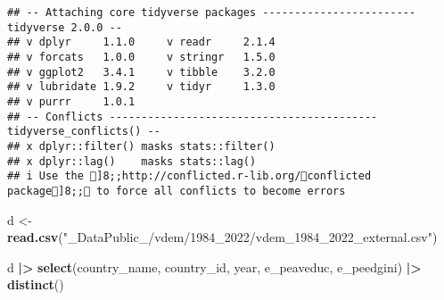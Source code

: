 \documentclass[
]{article}
\newenvironment{Shaded}{\begin{snugshade}}{\end{snugshade}}
\newcommand{\FunctionTok}[1]{\textcolor[rgb]{0.13,0.29,0.53}{\textbf{#1}}}
\newcommand{\NormalTok}[1]{#1}
\newcommand{\OtherTok}[1]{\textcolor[rgb]{0.56,0.35,0.01}{#1}}
\newcommand{\SpecialCharTok}[1]{\textcolor[rgb]{0.81,0.36,0.00}{\textbf{#1}}}
\newcommand{\StringTok}[1]{\textcolor[rgb]{0.31,0.60,0.02}{#1}}
\begin{document}
\begin{verbatim}
## -- Attaching core tidyverse packages ------------------------ tidyverse 2.0.0 --
## v dplyr     1.1.0     v readr     2.1.4
## v forcats   1.0.0     v stringr   1.5.0
## v ggplot2   3.4.1     v tibble    3.2.0
## v lubridate 1.9.2     v tidyr     1.3.0
## v purrr     1.0.1     
## -- Conflicts ------------------------------------------ tidyverse_conflicts() --
## x dplyr::filter() masks stats::filter()
## x dplyr::lag()    masks stats::lag()
## i Use the ]8;;http://conflicted.r-lib.org/conflicted package]8;; to force all conflicts to become errors
\end{verbatim}

\begin{Shaded}
\begin{Highlighting}[]
\NormalTok{d }\OtherTok{\textless{}{-}} \FunctionTok{read.csv}\NormalTok{(}\StringTok{"\_DataPublic\_/vdem/1984\_2022/vdem\_1984\_2022\_external.csv"}\NormalTok{)}
\end{Highlighting}
\end{Shaded}

\begin{Shaded}
\begin{Highlighting}[]
\NormalTok{d }\SpecialCharTok{|\textgreater{}} \FunctionTok{select}\NormalTok{(country\_name, country\_id, year, e\_peaveduc, e\_peedgini) }\SpecialCharTok{|\textgreater{}} \FunctionTok{distinct}\NormalTok{()}
\end{Highlighting}
\end{Shaded}
\end{document}
